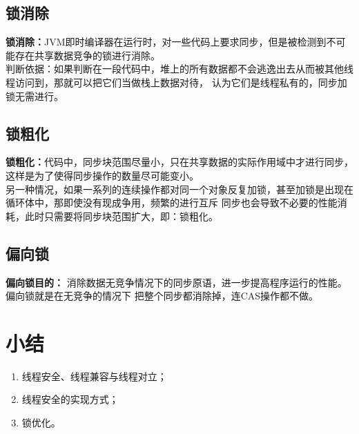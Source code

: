 \subsection{锁消除}
\noindent \textbf{锁消除：}JVM即时编译器在运行时，对一些代码上要求同步，但是被检测到不可能存在共享数据竞争的锁进行消除。
\\ 判断依据：如果判断在一段代码中，堆上的所有数据都不会逃逸出去从而被其他线程访问到，那就可以把它们当做栈上数据对待，
认为它们是线程私有的，同步加锁无需进行。
\subsection{锁粗化}
\noindent \textbf{锁粗化：}代码中，同步块范围尽量小，只在共享数据的实际作用域中才进行同步，
这样是为了使得同步操作的数量尽可能变小。
\\ 另一种情况，如果一系列的连续操作都对同一个对象反复加锁，甚至加锁是出现在循环体中，那即使没有现成争用，频繁的进行互斥
同步也会导致不必要的性能消耗，此时只需要将同步块范围扩大，即：锁粗化。
\subsection{偏向锁}
\noindent \textbf{偏向锁目的：}
消除数据无竞争情况下的同步原语，进一步提高程序运行的性能。偏向锁就是在无竞争的情况下
把整个同步都消除掉，连CAS操作都不做。
\section{小结}
\begin{enumerate}
	\item 线程安全、线程兼容与线程对立；
	\item 线程安全的实现方式；
	\item 锁优化。
\end{enumerate}